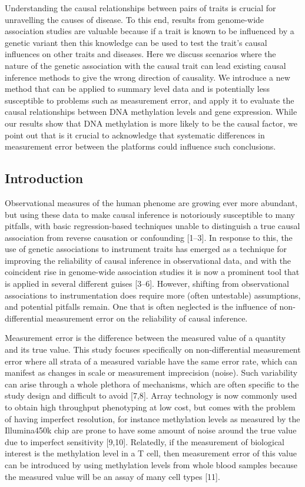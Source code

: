 \documentclass[]{article}
\begin{document}
Understanding the causal relationships between pairs of traits is
crucial for unravelling the causes of disease. To this end, results from
genome-wide association studies are valuable because if a trait is known
to be influenced by a genetic variant then this knowledge can be used to
test the trait's causal influences on other traits and diseases. Here we
discuss scenarios where the nature of the genetic association with the
causal trait can lead existing causal inference methods to give the
wrong direction of causality. We introduce a new method that can be
applied to summary level data and is potentially less susceptible to
problems such as measurement error, and apply it to evaluate the causal
relationships between DNA methylation levels and gene expression. While
our results show that DNA methylation is more likely to be the causal
factor, we point out that is it crucial to acknowledge that systematic
differences in measurement error between the platforms could influence
such conclusions.

\subsection{Introduction}\label{introduction}

Observational measures of the human phenome are growing ever more
abundant, but using these data to make causal inference is notoriously
susceptible to many pitfalls, with basic regression-based techniques
unable to distinguish a true causal association from reverse causation
or confounding {[}1--3{]}. In response to this, the use of genetic
associations to instrument traits has emerged as a technique for
improving the reliability of causal inference in observational data, and
with the coincident rise in genome-wide association studies it is now a
prominent tool that is applied in several different guises {[}3--6{]}.
However, shifting from observational associations to instrumentation
does require more (often untestable) assumptions, and potential pitfalls
remain. One that is often neglected is the influence of non-differential
measurement error on the reliability of causal inference.

Measurement error is the difference between the measured value of a
quantity and its true value. This study focuses specifically on
non-differential measurement error where all strata of a measured
variable have the same error rate, which can manifest as changes in
scale or measurement imprecision (noise). Such variability can arise
through a whole plethora of mechanisms, which are often specific to the
study design and difficult to avoid {[}7,8{]}. Array technology is now
commonly used to obtain high throughput phenotyping at low cost, but
comes with the problem of having imperfect resolution, for instance
methylation levels as measured by the Illumina450k chip are prone to
have some amount of noise around the true value due to imperfect
sensitivity {[}9,10{]}. Relatedly, if the measurement of biological
interest is the methylation level in a T cell, then measurement error of
this value can be introduced by using methylation levels from whole
blood samples because the measured value will be an assay of many cell
types {[}11{]}.
\end{document}
